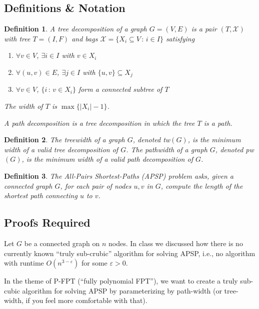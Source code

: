 \documentclass{article}
\newtheorem{definition}{Definition}
\begin{document}
\subsection*{Definitions \& Notation}
\begin{definition}
    A \emph{tree decomposition} of a graph $G = (V,E)$
    is a pair $(T, \mathcal{X})$ with tree $T = (I,F)$
    and bags $\mathcal{X} = \{X_i \subseteq V \,:\, i \in I \}$
    satisfying
    \begin{enumerate}
      \item $\forall v \in V$, $\exists i \in I$ with $v \in X_i$
      \item $\forall (u,v) \in E$, $\exists j \in I$ with $\{u,v\} \subseteq X_j$
      \item $\forall v \in V$, $\{i \,:\, v \in X_i\}$ form a connected subtree of $T$
    \end{enumerate}
    The \emph{width} of $T$ is $\max\{|X_i| - 1\}$.

    A \emph{path decomposition} is a tree decomposition in which the tree $T$ is a path.
\end{definition}

\begin{definition} The \emph{treewidth} of a graph $G$, denoted tw$(G)$, is the minimum width of a valid tree decomposition of $G$. The \emph{pathwidth} of a graph $G$, denoted pw$(G)$, is the minimum width of a valid path decomposition of $G$.
\end{definition}


\begin{definition}
    The All-Pairs Shortest-Paths (APSP) problem asks, given a connected graph $G$, for each pair of nodes $u, v$ in $G$, compute the length of the shortest path connecting $u$ to $v$.
\end{definition}

\subsection*{Proofs Required}

Let $G$ be a connected graph on $n$ nodes. In class we discussed how there is no currently known ``truly sub-crubic'' algorithm for solving APSP, i.e., no algorithm with runtime $O(n^{3-\varepsilon})$ for some $\varepsilon > 0$.

In the theme of P-FPT (``fully polynomial FPT''), we want to create a truly sub-cubic algorithm for solving APSP by parameterizing by path-width (or tree-width, if you feel more comfortable with that).
\end{document}
